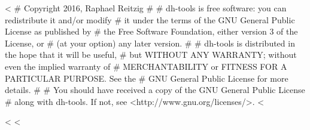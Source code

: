 <%
# Copyright 2016, Raphael Reitzig
#
# dh-tools is free software: you can redistribute it and/or modify
# it under the terms of the GNU General Public License as published by
# the Free Software Foundation, either version 3 of the License, or
# (at your option) any later version.
# 
# dh-tools is distributed in the hope that it will be useful,
# but WITHOUT ANY WARRANTY; without even the implied warranty of
# MERCHANTABILITY or FITNESS FOR A PARTICULAR PURPOSE.  See the
# GNU General Public License for more details.
# 
# You should have received a copy of the GNU General Public License
# along with dh-tools. If not, see <http://www.gnu.org/licenses/>.
<%
    <%
<%
